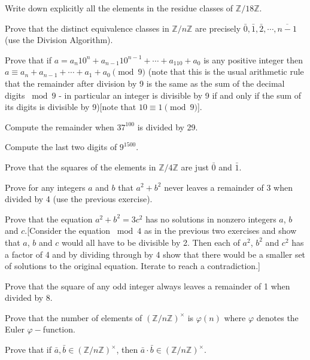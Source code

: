 \documentclass[cn,11pt,chinese]{elegantbook}
\numberwithin{equation}{section}
\begin{document}
\begin{problemset}
\item Write down explicitly all the elements in the residue classes of $\mathbb{Z}/18\mathbb{Z}$.

\item Prove that the distinct equivalence classes in $\mathbb{Z}/n\mathbb{Z}$ are precisely $\bar{0}, \bar{1}, \bar{2}, \cdots, \overline{n-1}$(use the Division Algorithm).

\item Prove that if $a= a_n10^n + a_{n-1}10^{n-1} + \cdots + a_110 + a_0$ is any positive integer then $a \equiv a_n + a_{n-1} + \cdots +a_1+a_0 \pmod{9}$ (note that this is the usual arithmetic rule that the remainder after division by 9 is the same as the sum of the decimal digits $\bmod{9}$ - in particular an integer is divisible by 9 if and only if the sum of its digits is divisible by 9)[note that $10 \equiv 1\pmod{9}$].

\item Compute the remainder when $37^{100}$ is divided by 29.

\item Compute the last two digits of $9^{1500}$.

\item Prove that the squares of the elements in $\mathbb{Z}/4\mathbb{Z}$ are just $\bar{0}$ and $\bar{1}$.

\item Prove for any integers $a$ and $b$ that $a^2 + b^2$ never leaves a remainder of 3 when divided by 4 (use the previous exercise).

\item Prove that the equation $a^2+b^2=3c^2$ has no solutions in nonzero integers $a$, $b$ and $c$.[Consider the equation $\bmod{4}$ as in the previous two exercises and show that $a$, $b$ and $c$ would all have to be divisible by 2. Then each of $a^2$, $b^2$ and $c^2$ has a factor of 4 and by dividing through by 4 show that there would be a smaller set of solutions to the original equation. Iterate to reach a contradiction.]

\item Prove that the square of any odd integer always leaves a remainder of 1 when divided by 8.

\item Prove that the number of elements of $(\mathbb{Z}/n\mathbb{Z})^{\times}$ is $\varphi(n)$ where $\varphi$ denotes the Euler $\varphi-$function.

\item Prove that if $\bar{a}, \bar{b} \in (\mathbb{Z}/n\mathbb{Z})^{\times}$, then $\bar{a} \cdot \bar{b} \in (\mathbb{Z}/n\mathbb{Z})^{\times}$.


\end{problemset}
\end{document}
